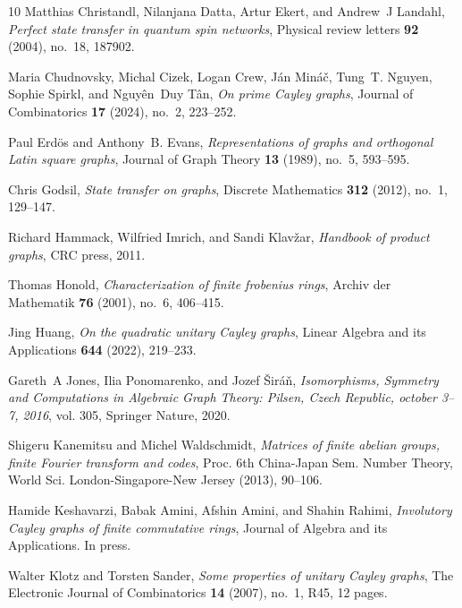 \documentclass[12pt, a4paper]{amsart}
\theoremstyle{definition}
\numberwithin{equation}{section}
\begin{document}
\begin{thebibliography}{10}
Matthias Christandl, Nilanjana Datta, Artur Ekert, and Andrew~J Landahl, \emph{Perfect state transfer in quantum spin networks}, Physical review letters \textbf{92} (2004), no.~18, 187902.

Maria Chudnovsky, Michal Cizek, Logan Crew, J{\'a}n Min{\'a}{\v{c}}, Tung~T. Nguyen, Sophie Spirkl, and Nguy{\^e}n~Duy T{\^a}n, \emph{On prime {Cayley} graphs}, Journal of Combinatorics \textbf{17} (2024), no.~2, 223--252.

Paul Erd{\"o}s and Anthony~B. Evans, \emph{Representations of graphs and orthogonal {Latin} square graphs}, Journal of Graph Theory \textbf{13} (1989), no.~5, 593--595.

Chris Godsil, \emph{State transfer on graphs}, Discrete Mathematics \textbf{312} (2012), no.~1, 129--147.

Richard Hammack, Wilfried Imrich, and Sandi Klav{\v{z}}ar, \emph{Handbook of product graphs}, CRC press, 2011.

Thomas Honold, \emph{Characterization of finite frobenius rings}, Archiv der Mathematik \textbf{76} (2001), no.~6, 406--415.

Jing Huang, \emph{On the quadratic unitary {Cayley} graphs}, Linear Algebra and its Applications \textbf{644} (2022), 219--233.

Gareth~A Jones, Ilia Ponomarenko, and Jozef {\v{S}}ir{\'a}{\v{n}}, \emph{Isomorphisms, {Symmetry} and {Computations} in {Algebraic Graph Theory: Pilsen, Czech Republic}, october 3--7, 2016}, vol. 305, Springer Nature, 2020.

Shigeru Kanemitsu and Michel Waldschmidt, \emph{Matrices of finite abelian groups, finite {Fourier} transform and codes}, Proc. 6th China-Japan Sem. Number Theory, World Sci. London-Singapore-New Jersey (2013), 90--106.

Hamide Keshavarzi, Babak Amini, Afshin Amini, and Shahin Rahimi, \emph{Involutory {C}ayley graphs of finite commutative rings}, Journal of Algebra and its Applications. In press.

Walter Klotz and Torsten Sander, \emph{Some properties of unitary {Cayley} graphs}, The Electronic Journal of Combinatorics \textbf{14} (2007), no.~1, R45, 12 pages.


\end{thebibliography}
\end{document}
